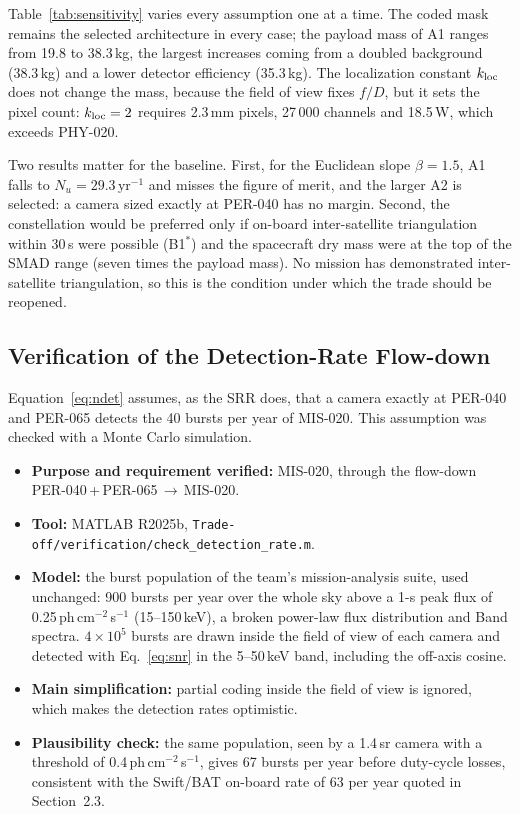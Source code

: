 Table~\ref{tab:sensitivity} varies every assumption one at a time. The coded mask remains the
selected architecture in every case; the payload mass of A1 ranges from 19.8 to 38.3\,kg, the
largest increases coming from a doubled background (38.3\,kg) and a lower detector efficiency
(35.3\,kg). The localization constant $k_{\rm loc}$ does not change the mass, because the
field of view fixes $f/D$, but it sets the pixel count: $k_{\rm loc}=2$ requires 2.3\,mm
pixels, 27\,000 channels and 18.5\,W, which exceeds PHY-020.

Two results matter for the baseline. First, for the Euclidean slope $\beta=1.5$, A1 falls to
$N_u=29.3\,\mathrm{yr^{-1}}$ and misses the figure of merit, and the larger A2 is selected:
a camera sized exactly at PER-040 has no margin. Second, the constellation would be preferred
only if on-board inter-satellite triangulation within 30\,s were possible (B1$^*$) and the
spacecraft dry mass were at the top of the SMAD range (seven times the payload mass). No
mission has demonstrated inter-satellite triangulation, so this is the condition under which
the trade should be reopened.

\subsection{Verification of the Detection-Rate Flow-down}\label{sec:flowdown}

Equation~\eqref{eq:ndet} assumes, as the SRR does, that a camera exactly at PER-040 and
PER-065 detects the 40 bursts per year of MIS-020. This assumption was checked with a
Monte Carlo simulation.

\begin{itemize}
\item \textbf{Purpose and requirement verified:} MIS-020, through the flow-down
PER-040\,+\,PER-065\,$\rightarrow$\,MIS-020.
\item \textbf{Tool:} MATLAB R2025b, \texttt{Trade-off/verification/check\_detection\_rate.m}.
\item \textbf{Model:} the burst population of the team's mission-analysis suite, used
unchanged: 900 bursts per year over the whole sky above a 1-s peak flux of
0.25\,ph\,cm$^{-2}$\,s$^{-1}$ (15--150\,keV), a broken power-law flux distribution and Band
spectra. $4\times10^5$ bursts are drawn inside the field of view of each camera and detected
with Eq.~\eqref{eq:snr} in the 5--50\,keV band, including the off-axis cosine.
\item \textbf{Main simplification:} partial coding inside the field of view is ignored, which
makes the detection rates optimistic.
\item \textbf{Plausibility check:} the same population, seen by a 1.4\,sr camera with a
threshold of 0.4\,ph\,cm$^{-2}$\,s$^{-1}$, gives 67 bursts per year before duty-cycle losses,
consistent with the Swift/BAT on-board rate of 63 per year quoted in Section~2.3.
\end{itemize}

